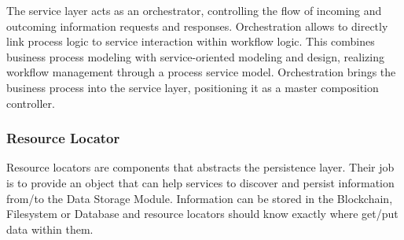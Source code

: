 The service layer acts as an orchestrator, controlling the flow of incoming and outcoming information requests and responses. Orchestration allows to directly link process logic to service interaction within workflow logic. This combines business process modeling with service-oriented modeling and design, realizing workflow management through a process service model. Orchestration brings the business process into the service layer, positioning it as a master composition controller.

\subsubsection{Resource Locator}\label{sec:ResourceLocator}

Resource locators are components that abstracts the persistence layer. Their job is to provide an object that can help services to discover and persist information from/to the Data Storage Module. Information can be stored in the Blockchain, Filesystem or Database and resource locators should know exactly where get/put data within them.  
